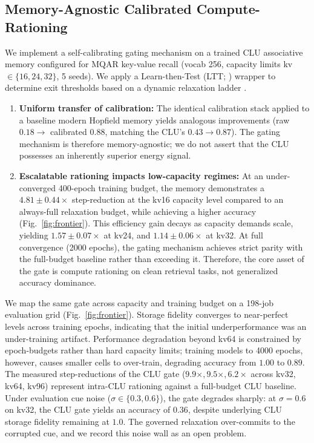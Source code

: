 \documentclass{article}
\begin{document}
\subsection{Memory-Agnostic Calibrated Compute-Rationing}
\label{sec:rationing}
We implement a self-calibrating gating mechanism on a trained CLU associative memory configured for MQAR key-value recall (vocab 256, capacity limits kv$\in\{16,24,32\}$, 5 seeds). We apply a Learn-then-Test (LTT; \citealp{angelopoulos_learn_2025}) wrapper to determine exit thresholds based on a dynamic relaxation ladder \citep{geifman_selective_2017}.
\begin{enumerate}\itemsep2pt
    \item \textbf{Uniform transfer of calibration:} The identical calibration stack applied to a baseline modern Hopfield memory \citep{ramsauer_hopfield_2021} yields analogous improvements (raw $0.18\to$ calibrated $0.88$, matching the CLU's $0.43\to0.87$). The gating mechanism is therefore memory-agnostic; we do not assert that the CLU possesses an inherently superior energy signal.
    \item \textbf{Escalatable rationing impacts low-capacity regimes:} At an under-converged 400-epoch training budget, the memory demonstrates a $4.81\pm0.44\times$ step-reduction at the kv16 capacity level compared to an always-full relaxation budget, while achieving a higher accuracy (Fig.~\ref{fig:frontier}). This efficiency gain decays as capacity demands scale, yielding $1.57\pm0.07\times$ at kv24, and $1.14\pm0.06\times$ at kv32. At full convergence (2000 epochs), the gating mechanism achieves strict parity with the full-budget baseline rather than exceeding it. Therefore, the core asset of the gate is compute rationing on clean retrieval tasks, not generalized accuracy dominance.
\end{enumerate}

We map the same gate across capacity and training budget on a 198-job evaluation grid (Fig.~\ref{fig:frontier}). Storage fidelity converges to near-perfect levels across training epochs, indicating that the initial underperformance was an under-training artifact. Performance degradation beyond kv64 is constrained by epoch-budgets rather than hard capacity limits; training models to 4000 epochs, however, causes smaller cells to over-train, degrading accuracy from $1.00$ to $0.89$. The measured step-reductions of the CLU gate ($9.9\times, 9.5\times, 6.2\times$ across kv32, kv64, kv96) represent intra-CLU rationing against a full-budget CLU baseline. Under evaluation cue noise ($\sigma\in\{0.3,0.6\}$), the gate degrades sharply: at $\sigma=0.6$ on kv32, the CLU gate yields an accuracy of $0.36$, despite underlying CLU storage fidelity remaining at $1.0$. The governed relaxation over-commits to the corrupted cue, and we record this noise wall as an open problem.
\end{document}
